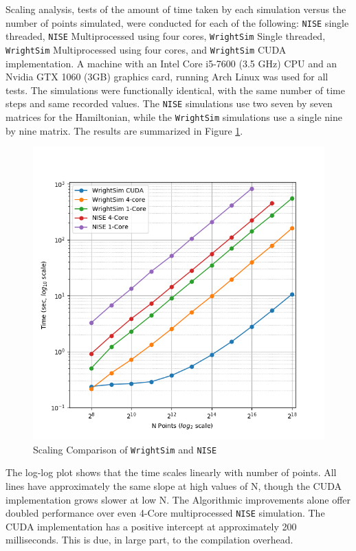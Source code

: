 Scaling analysis, tests of the amount of time taken by each simulation
versus the number of points simulated, were conducted for each of the
following: \texttt{NISE} single threaded, \texttt{NISE} Multiprocessed
using four cores, \texttt{WrightSim} Single threaded, \texttt{WrightSim}
Multiprocessed using four cores, and \texttt{WrightSim} CUDA
implementation. A machine with an Intel Core i5-7600 (3.5 GHz) CPU and
an Nvidia GTX 1060 (3GB) graphics card, running Arch Linux was used for
all tests. The simulations were functionally identical, with the same
number of time steps and same recorded values. The \texttt{NISE}
simulations use two seven by seven matrices for the Hamiltonian, while
the \texttt{WrightSim} simulations use a single nine by nine matrix. The
results are summarized in Figure \ref{sim:fig:scaling}.

\begin{figure}
\centering
\includegraphics{simulation/images/Scaling.png}
\caption{Scaling Comparison of \texttt{WrightSim} and \texttt{NISE}
\label{sim:fig:scaling}}
\end{figure}

The log-log plot shows that the time scales linearly with number of
points. All lines have approximately the same slope at high values of N,
though the CUDA implementation grows slower at low N. The Algorithmic
improvements alone offer doubled performance over even 4-Core
multiprocessed \texttt{NISE} simulation. The CUDA implementation has a
positive intercept at approximately 200 milliseconds. This is due, in
large part, to the compilation overhead.

